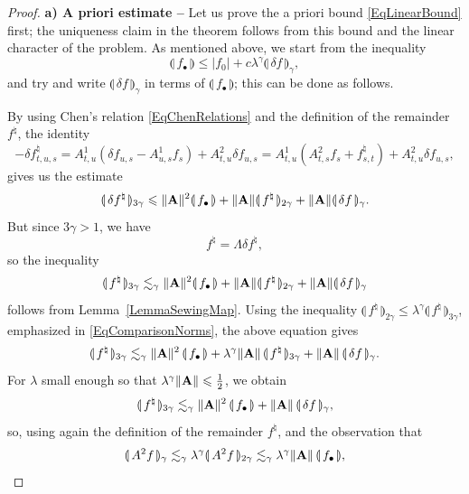 \documentclass[11pt,a4paper]{amsart}
\renewcommand{\leq}{\leqslant}
\theoremstyle{plain}%
\theoremstyle{definition}
\theoremstyle{remark}
\numberwithin{equation}{section} %
\begin{document}
\begin{proof}
{\bf a) A priori estimate --} Let us prove the a priori bound \eqref{EqLinearBound} first; the uniqueness claim in the theorem follows from this bound and the linear character of the problem. As mentioned above, we start from the inequality
$$
\llparenthesis\,f_\bullet \,\rrparenthesis \leq | f_0 | + c \lambda^\gamma \llparenthesis\, \delta f \,\rrparenthesis _\gamma,
$$
and try and write $\llparenthesis\, \delta f \,\rrparenthesis _\gamma$ in terms of $\llparenthesis\,f_\bullet \,\rrparenthesis$; this can be done as follows.

By using Chen's relation \eqref{EqChenRelations} and the definition of the remainder $f^\natural$, the identity
$$
- \delta f^\natural_{t, u, s} = A^1_{t, u} (\delta f_{u, s}  -A^1_{u, s} f_s) +A^2_{t, u} \delta f_{u, s} = A^1_{t, u} (A^2_{t, s} f_s + f^{\natural}_{s, t}) + A^2_{t, u} \delta f_{u, s}, 
$$
gives us the estimate
$$
\llparenthesis\, \delta f^{\natural} \,\rrparenthesis_{3 \gamma} \leq \| {\bf A} \| ^2 \llparenthesis\, f_\bullet \,\rrparenthesis + \| {\bf A} \| \llparenthesis\, f^{\natural} \,\rrparenthesis_{2 \gamma} + \| {\bf A} \| \llparenthesis\, \delta f \,\rrparenthesis_\gamma.
$$ 
But since $3 \gamma > 1$, we have 
$$
f^{\natural} = \Lambda \delta f^{\natural},
$$ 
so the inequality
$$
\llparenthesis\, f^{\natural} \,\rrparenthesis_{3 \gamma} \lesssim_\gamma \| {\bf A} \|^2 \llparenthesis\, f_\bullet \,\rrparenthesis + \| {\bf A} \| \llparenthesis\, f^{\natural} \,\rrparenthesis_{2 \gamma} + \| {\bf A} \| \llparenthesis\, \delta f \,\rrparenthesis_\gamma
$$
follows from Lemma~\ref{LemmaSewingMap}. Using the inequality $\llparenthesis\,  f^{\natural} \,\rrparenthesis_{2 \gamma} \leq \lambda^\gamma \llparenthesis\,  f^{\natural} \,\rrparenthesis_{3 \gamma}$, emphasized in \eqref{EqComparisonNorms}, the above equation gives 
$$
\llparenthesis\,  f^{\natural} \,\rrparenthesis_{3 \gamma} \lesssim_\gamma \| {\bf A} \|^2\, \llparenthesis\,  f_\bullet \,\rrparenthesis  + \lambda^\gamma \| {\bf A} \|\,\llparenthesis\,  f^{\natural}\,\rrparenthesis_{3 \gamma} + \| {\bf A} \|\, \llparenthesis\, \delta f \,\rrparenthesis_\gamma.
$$
For $\lambda$ small enough so that $\lambda^\gamma \| {\bf A} \| \leq \frac{1}{2}$, we obtain
$$
\llparenthesis\,  f^{\natural} \,\rrparenthesis_{3 \gamma} \lesssim_{\gamma} \| {\bf A} \|^2\, \llparenthesis\,  f_\bullet \,\rrparenthesis  + \| {\bf A} \|\, \llparenthesis\, \delta f \,\rrparenthesis_\gamma,
$$
so, using again the definition of the remainder $f^\natural$, and the observation that 
$$
\llparenthesis\, A^2 f\,\rrparenthesis_{\gamma} \lesssim_{\gamma}  \lambda^\gamma \llparenthesis\, A^2 f\,\rrparenthesis_{2 \gamma} \lesssim_{\gamma} \lambda^\gamma \| {\bf A} \|\, \llparenthesis\, f_\bullet \,\rrparenthesis,
$$
\end{proof}
\end{document}
